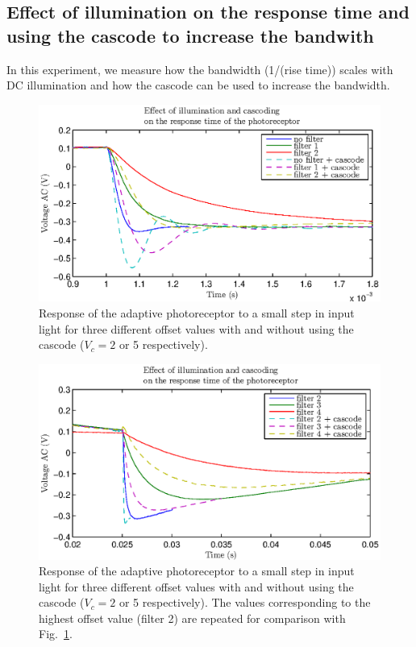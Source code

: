 \subsection{Effect of illumination on the response time and using the cascode to increase the bandwith}
In this experiment, we measure how the bandwidth (1/(rise time)) scales with DC illumination and how the cascode can be used to increase the bandwidth.
\begin{figure}[H]
	\center
	\includegraphics{exp2_2a.eps}
	\caption{Response of the adaptive photoreceptor to a small step in input light for three different offset values with and without using the cascode ($V_c=2$ or 5 respectively).}
	\label{fig:exp2.2a}
\end{figure}

\begin{figure}
	\center
	\includegraphics{exp2_2b.eps}
	\caption{Response of the adaptive photoreceptor to a small step in input light for three different offset values with and without using the cascode ($V_c=2$ or 5 respectively). The values corresponding to the highest offset value (filter 2) are repeated for comparison with Fig.~\ref{fig:exp2.2a}.} 
	\label{fig:exp2.2b}
\end{figure}

